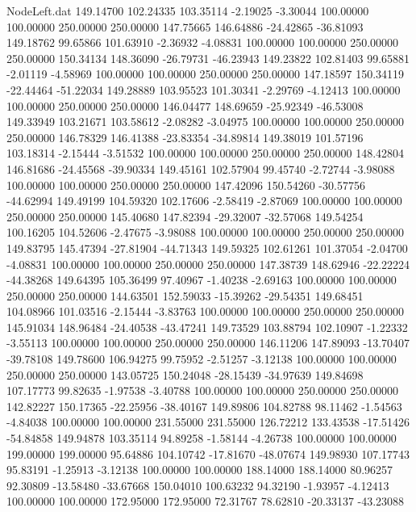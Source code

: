 \begin{filecontents}{NodeLeft.dat}
 149.14700  102.24335  103.35114    -2.19025   -3.30044  100.00000  100.00000  250.00000  250.00000  147.75665  146.64886  -24.42865  -36.81093
 149.18762   99.65866  101.63910    -2.36932   -4.08831  100.00000  100.00000  250.00000  250.00000  150.34134  148.36090  -26.79731  -46.23943
 149.23822  102.81403   99.65881    -2.01119   -4.58969  100.00000  100.00000  250.00000  250.00000  147.18597  150.34119  -22.44464  -51.22034
 149.28889  103.95523  101.30341    -2.29769   -4.12413  100.00000  100.00000  250.00000  250.00000  146.04477  148.69659  -25.92349  -46.53008
 149.33949  103.21671  103.58612    -2.08282   -3.04975  100.00000  100.00000  250.00000  250.00000  146.78329  146.41388  -23.83354  -34.89814
 149.38019  101.57196  103.18314    -2.15444   -3.51532  100.00000  100.00000  250.00000  250.00000  148.42804  146.81686  -24.45568  -39.90334
 149.45161  102.57904   99.45740    -2.72744   -3.98088  100.00000  100.00000  250.00000  250.00000  147.42096  150.54260  -30.57756  -44.62994
 149.49199  104.59320  102.17606    -2.58419   -2.87069  100.00000  100.00000  250.00000  250.00000  145.40680  147.82394  -29.32007  -32.57068
 149.54254  100.16205  104.52606    -2.47675   -3.98088  100.00000  100.00000  250.00000  250.00000  149.83795  145.47394  -27.81904  -44.71343
 149.59325  102.61261  101.37054    -2.04700   -4.08831  100.00000  100.00000  250.00000  250.00000  147.38739  148.62946  -22.22224  -44.38268
 149.64395  105.36499   97.40967    -1.40238   -2.69163  100.00000  100.00000  250.00000  250.00000  144.63501  152.59033  -15.39262  -29.54351
 149.68451  104.08966  101.03516    -2.15444   -3.83763  100.00000  100.00000  250.00000  250.00000  145.91034  148.96484  -24.40538  -43.47241
 149.73529  103.88794  102.10907    -1.22332   -3.55113  100.00000  100.00000  250.00000  250.00000  146.11206  147.89093  -13.70407  -39.78108
 149.78600  106.94275   99.75952    -2.51257   -3.12138  100.00000  100.00000  250.00000  250.00000  143.05725  150.24048  -28.15439  -34.97639
 149.84698  107.17773   99.82635    -1.97538   -3.40788  100.00000  100.00000  250.00000  250.00000  142.82227  150.17365  -22.25956  -38.40167
 149.89806  104.82788   98.11462    -1.54563   -4.84038  100.00000  100.00000  231.55000  231.55000  126.72212  133.43538  -17.51426  -54.84858
 149.94878  103.35114   94.89258    -1.58144   -4.26738  100.00000  100.00000  199.00000  199.00000   95.64886  104.10742  -17.81670  -48.07674
 149.98930  107.17743   95.83191    -1.25913   -3.12138  100.00000  100.00000  188.14000  188.14000   80.96257   92.30809  -13.58480  -33.67668
 150.04010  100.63232   94.32190    -1.93957   -4.12413  100.00000  100.00000  172.95000  172.95000   72.31767   78.62810  -20.33137  -43.23088

\end{filecontents}
